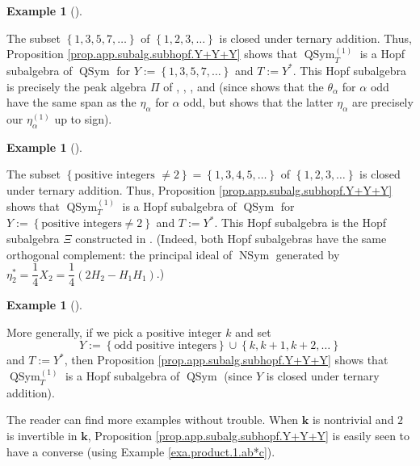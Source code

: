 \documentclass[numbers=enddot,12pt,final,onecolumn,notitlepage]{scrartcl}%
\theoremstyle{definition}
\newtheorem{exam}[theo]{Example}
\newenvironment{example}[1][]
{\begin{exam}[#1]\begin{leftbar}}
{\end{leftbar}\end{exam}}
\begin{document}
\begin{example}
The subset $\left\{  1,3,5,7,\ldots\right\}  $ of $\left\{  1,2,3,\ldots
\right\}  $ is closed under ternary addition. Thus, Proposition
\ref{prop.app.subalg.subhopf.Y+Y+Y} shows that $\operatorname*{QSym}%
\nolimits_{T}^{\left(  1\right)  }$ is a Hopf subalgebra of
$\operatorname*{QSym}$ for $Y:=\left\{  1,3,5,7,\ldots\right\}  $ and
$T:=Y^{\ast}$. This Hopf subalgebra is precisely the peak algebra $\Pi$ of
\cite[\S 3]{Stembr97}, \cite[\S 6, particularly Proposition 6.5]{AgBeSo14},
\cite{BMSW99}, \cite[\S 5]{BMSW00} and \cite{Hsiao07} (since \cite[(2.1) and
(2.2)]{Hsiao07} shows that the $\theta_{\alpha}$ for $\alpha$ odd have the
same span as the $\eta_{\alpha}$ for $\alpha$ odd, but \cite[Proposition
2.1]{Hsiao07} shows that the latter $\eta_{\alpha}$ are precisely our
$\eta_{\alpha}^{\left(  1\right)  }$ up to sign).
\end{example}

\begin{example}
The subset $\left\{  \text{positive integers }\neq2\right\}  =\left\{
1,3,4,5,\ldots\right\}  $ of $\left\{  1,2,3,\ldots\right\}  $ is closed under
ternary addition. Thus, Proposition \ref{prop.app.subalg.subhopf.Y+Y+Y} shows
that $\operatorname*{QSym}\nolimits_{T}^{\left(  1\right)  }$ is a Hopf
subalgebra of $\operatorname*{QSym}$ for $Y:=\left\{  \text{positive integers
}\neq2\right\}  $ and $T:=Y^{\ast}$. This Hopf subalgebra is the Hopf
subalgebra $\Xi$ constructed in \cite[Theorem 5.7]{BMSW00}. (Indeed, both Hopf
subalgebras have the same orthogonal complement: the principal ideal of
$\operatorname*{NSym}$ generated by $\eta_{2}^{\ast}=\dfrac{1}{4}X_{2}%
=\dfrac{1}{4}\left(  2H_{2}-H_{1}H_{1}\right)  $.)
\end{example}

\begin{example}
More generally, if we pick a positive integer $k$ and set
\[
Y:=\left\{  \text{odd positive integers}\right\}  \cup\left\{
k,k+1,k+2,\ldots\right\}
\]
and $T:=Y^{\ast}$, then Proposition \ref{prop.app.subalg.subhopf.Y+Y+Y} shows
that $\operatorname*{QSym}\nolimits_{T}^{\left(  1\right)  }$ is a Hopf
subalgebra of $\operatorname*{QSym}$ (since $Y$ is closed under ternary addition).
\end{example}

The reader can find more examples without trouble. When $\mathbf{k}$ is
nontrivial and $2$ is invertible in $\mathbf{k}$, Proposition
\ref{prop.app.subalg.subhopf.Y+Y+Y} is easily seen to have a converse (using
Example \ref{exa.product.1.ab*c}).
\end{document}
